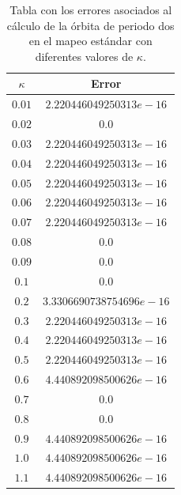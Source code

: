 \begin{center}
\begin{table}[H]
	\centering
	\begin{tabular}{|c|c|}
		\hline
		$\kappa$&  Error  \\
		\hline
		$0.01$ &  $2.220446049250313e-16$\\
		\hline
		$0.02$& $0.0$ \\
		\hline
		$0.03$	& $2.220446049250313e-16$  \\
		\hline
		$0.04$&  $2.220446049250313e-16$\\
		\hline
		$0.05$&  $2.220446049250313e-16$\\
		\hline
		$0.06$&  $2.220446049250313e-16$\\
		\hline
		$0.07$&  $2.220446049250313e-16$\\
		\hline
		$0.08$& $0.0$  \\
		\hline
		$0.09$& $0.0$  \\
		\hline
		$0.1$& $0.0$  \\
		\hline
		$0.2$&$3.3306690738754696e-16$  \\
		\hline
		$0.3$& $2.220446049250313e-16$ \\
		\hline
		$0.4$&$2.220446049250313e-16$  \\
		\hline
		$0.5$&$2.220446049250313e-16$  \\
		\hline
		$0.6$& $4.440892098500626e-16$ \\
		\hline
		$0.7$& $0.0$  \\
		\hline
		$0.8$& $0.0$ \\
		\hline
		$0.9$& $4.440892098500626e-16$   \\
		\hline
		$1.0$& $4.440892098500626e-16$  \\
		\hline
		$1.1$& $4.440892098500626e-16$  \\
		\hline
	\end{tabular}
\caption{Tabla con los errores asociados al c\'alculo de la \'orbita de periodo dos en el mapeo est\'andar con diferentes valores de $\kappa$.}
\end{table}
\end{center}


